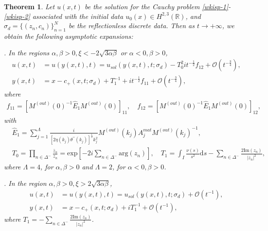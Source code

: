 \documentclass[11pt]{article}
\numberwithin{equation}{section}
\newtheorem{theorem}{Theorem}
\begin{document}
\FloatBarrier



\begin{theorem}\label{thm1}
    Let $u(x,t)$ be the solution  for  the Cauchy  problem \eqref{wkisp-1}-\eqref{wkisp-2} associated with the initial data
  $u_0(x) \in H^{2,3}(\mathbb{R})$, and $\sigma_d=\{(z_n, c_n)\}_{n=1}^N$ be the reflectionless discrete data. Then  as   $ t\to+\infty$,  we obtain the following asymptotic expansions:

\noindent\textbf{\textup{ \uppercase\expandafter{}}}. In the regions $\alpha, \beta>0,\xi<-2\sqrt{3\alpha\beta}$ or $\alpha<0, \beta>0$,
\begin{align*}
    u(x,t)&=u(y(x,t),t)=u_{sol}(y(x,t), t;\sigma_d)-T_0^{2}it^{-\frac{1}{2}}f_{12}+\mathcal{O}(t^{-\frac{3}{4}}),\\
    y(x,t)&=x-c_+(x,t;\sigma_d)+T_1^{-1}+it^{-\frac{1}{2}}f_{11}+\mathcal{O}(t^{-\frac{3}{4}}),
\end{align*}
where
\begin{align*}
    f_{11} = \left[ M^{(out)}(0)^{-1}\widehat{E}_1 M^{(out)}(0) \right]_{11},\quad f_{12} = \left[ M^{(out)}(0)^{-1} \widehat{E}_1 M^{(out)}(0) \right]_{12},
\end{align*}
with
\begin{align*}
   & \widehat E_1=\sum_{j=1}^\Lambda \frac{i  }{\left[2  \eta(k_j) \theta^{\prime\prime}(k_j)\right]^{\frac{1}{2}} k_j^2}M^{(out)}(k_j)A_j^{mat}M^{(out)}(k_j)^{-1},\\ &T_0=\prod\limits_{n\in\Delta^-}\frac{\bar{z}_n}{z_n}=\mathrm{exp}\left[-2i\sum_{n\in\Delta^-}\mathrm{arg}(z_n)\right],\quad T_1=\int_I\frac{\nu(s)}{s^2}\mathrm{d}s-\sum_{n\in\Delta^-}\frac{2\mathrm{Im}(z_n)}{|z_n|^2},
\end{align*}
where $\Lambda=4$, for $\alpha,\beta>0$ and
$\Lambda=2$, for $\alpha<0,\beta>0$.

\noindent\textbf{\textup{ \uppercase\expandafter{}}}. In the region $\alpha, \beta>0,\xi>2\sqrt{3\alpha\beta}$,
\begin{align*}
    u(x,t)&=u(y(x,t),t)=u_{sol}(y(x,t), t;\sigma_d)+\mathcal{O}(t^{-1}),\\
    y(x,t)&=x-c_+(x,t;\sigma_d)+iT_1^{-1}+\mathcal{O}(t^{-1}),
\end{align*}
where $T_1=-\displaystyle\sum_{n\in\Delta^-}\frac{2\mathrm{Im}(z_n)}{|z_n|^2}$.


\end{theorem}
\end{document}
